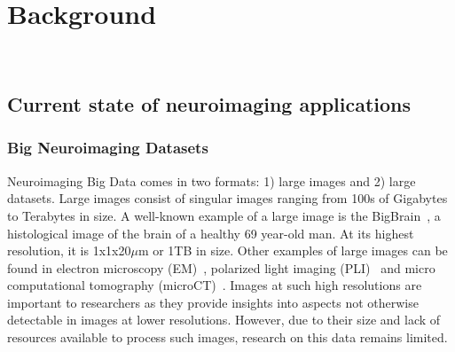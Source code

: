 
    
    \chapter{Background}~\label{chp:background} 
    \section{Current state of neuroimaging applications}
        

        \subsection{Big Neuroimaging Datasets}\label{datasets}


            Neuroimaging Big Data comes in two formats: 1) large images and 2)
            large datasets. Large images consist of singular images ranging from
            100s of Gigabytes to Terabytes in size. A well-known example of a large image
            is the BigBrain~\cite{Amunts1472}, a histological image of
            the brain of a healthy 69 year-old man. At its highest resolution,
            it is 1x1x20$\mu$m or 1TB in size. Other examples of large images
            can be found in electron microscopy (EM)~\cite{Hildebrand:2017aa},
            polarized light imaging (PLI)~\cite{10.1007/978-3-319-12084-3_1} and
            micro computational tomography
            (microCT)~\cite{10.1371/journal.pone.0035691}. Images at such high
            resolutions are important to researchers as they provide insights
            into aspects not otherwise detectable in images at lower
            resolutions. However, due to their size and lack of resources
            available to process such images, research on this data remains
            limited.

